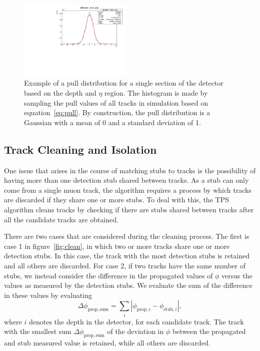 \begin{figure}[htbp] %
  \centering
  \includegraphics[width=0.48\textwidth]{fig/TPS/deltaPhi_pull.pdf}
  \caption{Example of a pull distribution for a single section of the detector based on the depth and $\eta$ region. The histogram is made by sampling the pull values of all tracks in simulation based on equation~\ref{eq:pull}. By construction, the pull distribution is a Gaussian with a mean of 0 and a standard deviation of 1.}
  \label{fig:deltaPhiPull}
\end{figure}


\subsection{Track Cleaning and Isolation}
\label{subsec:cleaning}

One issue that arises in the course of matching stubs to tracks is the possibility of having more than one detection stub shared between tracks.
As a stub can only come from a single muon track, the algorithm requires a process by which tracks are discarded if they share one or more stubs.
To deal with this, the TPS algorithm cleans tracks by checking if there are stubs shared between tracks after all the candidate tracks are obtained.

There are two cases that are considered during the cleaning process.
The first is case 1 in figure~\ref{fig:clean}, in which two or more tracks share one or more detection stubs. In this case, the track with the most detection stubs is retained and all others are discarded.
For case 2, if two tracks have the same number of stubs, we instead consider the difference in the propagated values of $\phi$ versus the values as measured by the detection stubs.
We evaluate the sum of the difference in these values by evaluating
\begin{equation}\label{eq:phiDev}
  \Delta\phi_{\mathrm{prop,sum}}=\sum_i|\phi_{\mathrm{prop},i}-\phi_{\mathrm{stub},i}|,
\end{equation}
where $i$ denotes the depth in the detector, for each candidate track.
The track with the smallest sum $\Delta\phi_{\mathrm{prop,sum}}$ of the deviation in $\phi$ between the propagated and stub measured value is retained, while all others are discarded.


